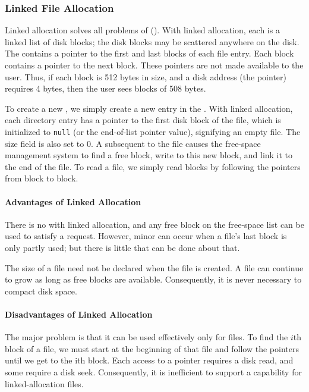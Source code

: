 \subsubsection{Linked File Allocation}\label{subsubsec:Linked_File_Allocation}
Linked allocation solves all problems of  ().
With linked allocation, each  is a linked list of disk blocks; the disk blocks may be scattered anywhere on the disk.
The  contains a pointer to the first and last blocks of each file entry.
Each block contains a pointer to the next block.
These pointers are not made available to the user.
Thus, if each block is 512 bytes in size, and a disk address (the pointer) requires 4 bytes, then the user sees blocks of 508 bytes.

To create a new , we simply create a new entry in the .
With linked allocation, each directory entry has a pointer to the first disk block of the file, which is initialized to \texttt{null} (or the end-of-list pointer value), signifying an empty file.
The size field is also set to 0.
A subsequent  to the file causes the free-space management system to find a free block, write to this new block, and link it to the end of the file.
To read a file, we simply read blocks by following the pointers from block to block.

\paragraph{Advantages of Linked Allocation}\label{par:Linked_File_Allocation_Advantages}
There is no  with linked allocation, and any free block on the free-space list can be used to satisfy a request.
However, minor  can occur when a file's last block is only partly used; but there is little that can be done about that.

The size of a file need not be declared when the file is created.
A file can continue to grow as long as free blocks are available.
Consequently, it is never necessary to compact disk space.

\paragraph{Disadvantages of Linked Allocation}\label{par:Linked_File_Allocation_Disadvantages}
The major problem is that it can be used effectively only for  files.
To find the $i$th block of a file, we must start at the beginning of that file and follow the pointers until we get to the ith block.
Each access to a pointer requires a disk read, and some require a disk seek.
Consequently, it is inefficient to support a  capability for linked-allocation files.

